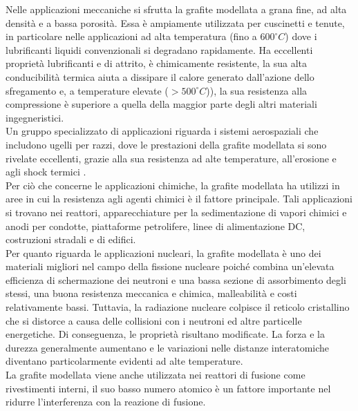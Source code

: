 \documentclass[a4paper,titlepage]{book}
\begin{document}
Nelle applicazioni meccaniche si sfrutta la grafite modellata a grana fine, ad alta densità e a bassa porosità. Essa è ampiamente utilizzata per cuscinetti e tenute, in particolare nelle applicazioni ad alta temperatura (fino a $600 ^\circ C$) dove i lubrificanti liquidi convenzionali si degradano rapidamente. Ha eccellenti proprietà lubrificanti e di attrito, è chimicamente resistente, la sua alta conducibilità termica aiuta a dissipare il calore generato dall'azione dello sfregamento e, a temperature elevate ($> 500 ^\circ C$)), la sua resistenza alla compressione è superiore a quella della maggior parte degli altri materiali ingegneristici. \\

Un gruppo specializzato di applicazioni riguarda i sistemi aerospaziali che includono ugelli per razzi, dove le prestazioni della grafite modellata si sono rivelate eccellenti, grazie alla sua resistenza ad alte temperature, all'erosione e agli shock termici .\\

Per ciò che concerne le applicazioni chimiche, la grafite modellata ha utilizzi in aree in cui la resistenza agli agenti chimici è il fattore principale. Tali applicazioni si trovano nei reattori, apparecchiature per la sedimentazione di vapori chimici e anodi per condotte, piattaforme petrolifere, linee di alimentazione DC, costruzioni stradali e di edifici.\\

Per quanto riguarda le applicazioni nucleari, la grafite modellata è uno dei materiali migliori nel campo della fissione nucleare poiché combina un'elevata efficienza di schermazione dei neutroni e una bassa sezione di assorbimento degli stessi, una buona resistenza meccanica e chimica, malleabilità e costi relativamente bassi. Tuttavia, la radiazione nucleare colpisce il reticolo cristallino che si distorce a causa delle collisioni con i neutroni ed altre particelle energetiche. Di conseguenza, le proprietà risultano modificate. La forza e la durezza generalmente aumentano e le variazioni nelle distanze interatomiche diventano particolarmente evidenti ad alte temperature. \\
La grafite modellata viene anche utilizzata nei reattori di fusione come rivestimenti interni, il suo basso numero atomico è un fattore importante nel ridurre l'interferenza con la reazione di fusione. 
\end{document}
